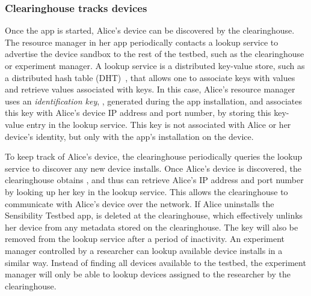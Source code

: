 \subsubsection{Clearinghouse tracks devices}\label{sec-case1}
Once the app is started, Alice's device can be discovered by 
the clearinghouse. The resource manager in her app periodically contacts 
a lookup service to advertise the device sandbox to the rest of the testbed, 
such as the clearinghouse or experiment manager. 
A lookup service is a distributed key-value store, such as a 
distributed hash table (DHT)~\cite{dht}, that allows one to associate 
keys with values and retrieve values associated with keys. In this case, 
Alice's resource manager uses an \textit{identification key}, , 
generated during the app installation, and associates this key 
with Alice's device IP address and port number, by 
storing this key-value entry in the lookup service. This key is not 
associated with Alice or her device's identity, but only with the app's 
installation on the device. 


To keep track of Alice's device, the
clearinghouse periodically queries the lookup service to
discover any new device installs. Once Alice's device is discovered, the
clearinghouse obtains , and thus
can retrieve Alice's  IP address and port number by 
looking up her key in the lookup service. This allows the clearinghouse
to communicate with Alice's device over the network.
If Alice uninstalls the Sensibility Testbed app, 
 is deleted at the clearinghouse, which effectively unlinks
her device from any metadata stored on the clearinghouse. The key
will also be removed from the lookup service after a period of inactivity.
An experiment manager controlled by a researcher can lookup
available device installs in a similar way. Instead of finding all devices
available to the testbed, the experiment manager will only be able to 
lookup devices assigned to the researcher by the clearinghouse.

